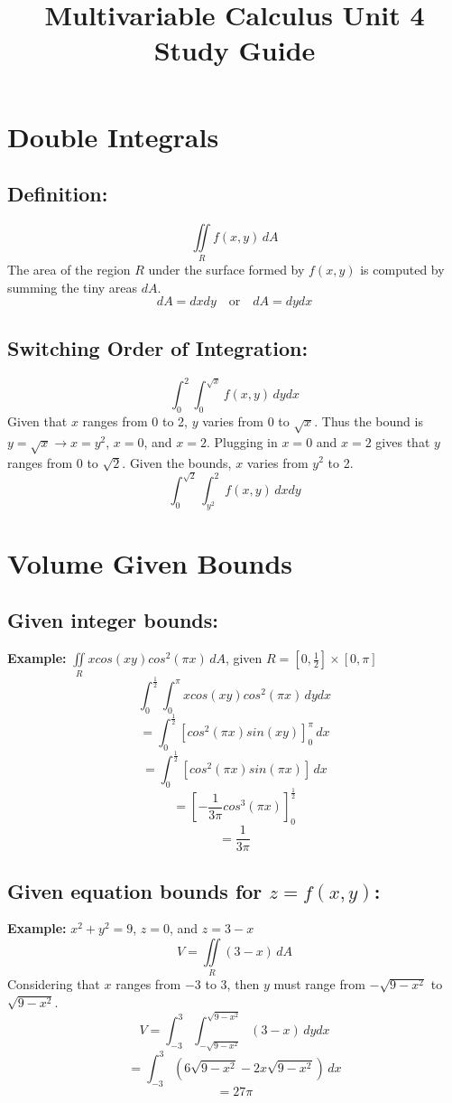 \documentclass{article}
\title{Multivariable Calculus Unit 4 Study Guide}
\author{}
\date{}
\begin{document}
\maketitle

\section{Double Integrals}
\subsection{Definition:}
\[
\iint\limits_{R} f(x,y)\, dA
\]
The area of the region $R$ under the surface formed by $f(x,y)$ is computed by summing the tiny areas $dA$.
\[
dA = dxdy \quad \text{or} \quad dA = dydx
\]

\subsection{Switching Order of Integration:}
\[
\int_{0}^{2} \int_{0}^{\sqrt{x}} f(x,y)\, dydx
\]
Given that $x$ ranges from 0 to 2, $y$ varies from 0 to $\sqrt{x}$. Thus the bound is $y=\sqrt{x} \to x=y^2$, $x=0$, and $x=2$. Plugging in $x=0$ and $x=2$ gives that $y$ ranges from 0 to $\sqrt{2}$. Given the bounds, $x$ varies from $y^2$ to 2.
\[
\int_{0}^{\sqrt{2}} \int_{y^2}^{2} f(x,y)\, dxdy
\]  

\section{Volume Given Bounds}
\subsection{Given integer bounds:}
\textbf{Example: }$\iint\limits_{R} xcos(xy)cos^2(\pi x)\, dA$, given $R = [0, \frac{1}{2}] \times [0, \pi ]$
\[
\int_{0}^{\frac{1}{2}} \int_{0}^{\pi} xcos(xy)cos^2(\pi x)\, dydx    
\]
\[
=\int_{0}^{\frac{1}{2}} \left[ cos^{2}(\pi x)sin(xy) \right]_{0}^{\pi} \, dx
\]
\[
=\int_{0}^{\frac{1}{2}} \left[ cos^{2}(\pi x)sin(\pi x) \right] \, dx
\]
\[
=\left[ -\frac{1}{3\pi} cos^{3}(\pi x) \right]_{0}^{\frac{1}{2}}
\]
\[
=\frac{1}{3\pi}
\]

\subsection{Given equation bounds for $z=f(x,y)$:}
\textbf{Example: }$x^2+y^2=9$, $z=0$, and $z=3-x$
\[
V=\iint\limits_{R} (3-x)\, dA
\]
Considering that $x$ ranges from $-3$ to $3$, then $y$ must range from $-\sqrt{9-x^2}$ to $\sqrt{9-x^2}$.
\[
V=\int_{-3}^{3} \int_{-\sqrt{9-x^2}}^{\sqrt{9-x^2}} (3-x)\, dydx
\]
\[
=\int_{-3}^{3} (6\sqrt{9-x^2}-2x\sqrt{9-x^2})\, dx
\]
\[
=27\pi
\]
\end{document}
